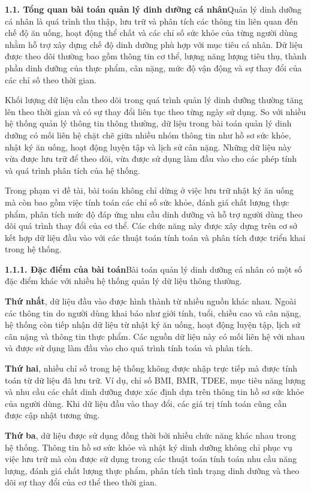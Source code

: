 \textbf{1.1. Tổng quan bài toán quản lý dinh dưỡng cá nhân}Quản lý dinh dưỡng cá nhân là quá trình thu thập, lưu trữ và phân tích các thông tin liên quan đến chế độ ăn uống, hoạt động thể chất và các chỉ số sức khỏe của từng người dùng nhằm hỗ trợ xây dựng chế độ dinh dưỡng phù hợp với mục tiêu cá nhân. Dữ liệu được theo dõi thường bao gồm thông tin cơ thể, lượng năng lượng tiêu thụ, thành phần dinh dưỡng của thực phẩm, cân nặng, mức độ vận động và sự thay đổi của các chỉ số theo thời gian.

Khối lượng dữ liệu cần theo dõi trong quá trình quản lý dinh dưỡng thường tăng lên theo thời gian và có sự thay đổi liên tục theo từng ngày sử dụng. So với nhiều hệ thống quản lý thông tin thông thường, dữ liệu trong bài toán quản lý dinh dưỡng có mối liên hệ chặt chẽ giữa nhiều nhóm thông tin như hồ sơ sức khỏe, nhật ký ăn uống, hoạt động luyện tập và lịch sử cân nặng. Những dữ liệu này vừa được lưu trữ để theo dõi, vừa được sử dụng làm đầu vào cho các phép tính và quá trình phân tích của hệ thống.

Trong phạm vi đề tài, bài toán không chỉ dừng ở việc lưu trữ nhật ký ăn uống mà còn bao gồm việc tính toán các chỉ số sức khỏe, đánh giá chất lượng thực phẩm, phân tích mức độ đáp ứng nhu cầu dinh dưỡng và hỗ trợ người dùng theo dõi quá trình thay đổi của cơ thể. Các chức năng này được xây dựng trên cơ sở kết hợp dữ liệu đầu vào với các thuật toán tính toán và phân tích được triển khai trong hệ thống.

\textbf{1.1.1. Đặc điểm của bài toán}Bài toán quản lý dinh dưỡng cá nhân có một số đặc điểm khác với nhiều hệ thống quản lý dữ liệu thông thường.

\textbf{Thứ nhất}, dữ liệu đầu vào được hình thành từ nhiều nguồn khác nhau. Ngoài các thông tin do người dùng khai báo như giới tính, tuổi, chiều cao và cân nặng, hệ thống còn tiếp nhận dữ liệu từ nhật ký ăn uống, hoạt động luyện tập, lịch sử cân nặng và thông tin thực phẩm. Các nguồn dữ liệu này có mối liên hệ với nhau và được sử dụng làm đầu vào cho quá trình tính toán và phân tích.

\textbf{Thứ hai}, nhiều chỉ số trong hệ thống không được nhập trực tiếp mà được tính toán từ dữ liệu đã lưu trữ. Ví dụ, chỉ số BMI, BMR, TDEE, mục tiêu năng lượng và nhu cầu các chất dinh dưỡng được xác định dựa trên thông tin hồ sơ sức khỏe của người dùng. Khi dữ liệu đầu vào thay đổi, các giá trị tính toán cũng cần được cập nhật tương ứng.

\textbf{Thứ ba}, dữ liệu được sử dụng đồng thời bởi nhiều chức năng khác nhau trong hệ thống. Thông tin hồ sơ sức khỏe và nhật ký dinh dưỡng không chỉ phục vụ việc lưu trữ mà còn được sử dụng trong các thuật toán tính toán nhu cầu năng lượng, đánh giá chất lượng thực phẩm, phân tích tình trạng dinh dưỡng và theo dõi sự thay đổi của cơ thể theo thời gian.

